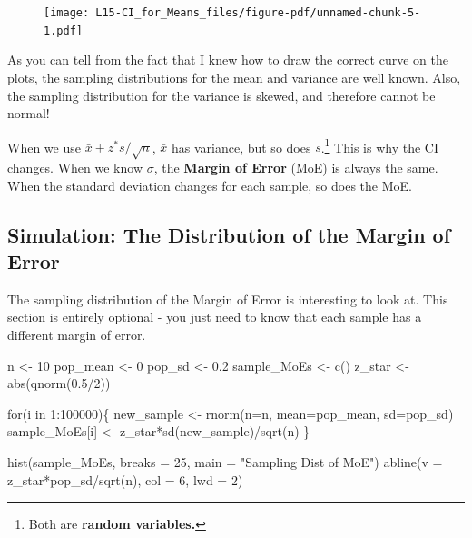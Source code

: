 \documentclass[
  letterpaper,
  DIV=11,
  numbers=noendperiod,
  oneside]{scrreprt}
\newenvironment{Shaded}{\begin{snugshade}}{\end{snugshade}}
\newcommand{\AttributeTok}[1]{\textcolor[rgb]{0.40,0.45,0.13}{#1}}
\newcommand{\ControlFlowTok}[1]{\textcolor[rgb]{0.00,0.23,0.31}{#1}}
\newcommand{\DecValTok}[1]{\textcolor[rgb]{0.68,0.00,0.00}{#1}}
\newcommand{\FloatTok}[1]{\textcolor[rgb]{0.68,0.00,0.00}{#1}}
\newcommand{\FunctionTok}[1]{\textcolor[rgb]{0.28,0.35,0.67}{#1}}
\newcommand{\NormalTok}[1]{\textcolor[rgb]{0.00,0.23,0.31}{#1}}
\newcommand{\OtherTok}[1]{\textcolor[rgb]{0.00,0.23,0.31}{#1}}
\newcommand{\SpecialCharTok}[1]{\textcolor[rgb]{0.37,0.37,0.37}{#1}}
\newcommand{\StringTok}[1]{\textcolor[rgb]{0.13,0.47,0.30}{#1}}
\begin{document}
\begin{figure}[H]

{\centering \texttt{[image: L15-CI\_for\_Means\_files/figure-pdf/unnamed-chunk-5-1.pdf]}

}

\end{figure}

As you can tell from the fact that I knew how to draw the correct curve
on the plots, the sampling distributions for the mean and variance are
well known. Also, the sampling distribution for the variance is skewed,
and therefore cannot be normal!

When we use \(\bar x+ z^*s/\sqrt{n}\), \(\bar x\) has variance, but so
does \(s\).\footnote{Both are \textbf{random variables.}} This is why
the CI changes. When we know \(\sigma\), the \textbf{Margin of Error}
(MoE) is always the same. When the standard deviation changes for each
sample, so does the MoE.

\hypertarget{simulation-the-distribution-of-the-margin-of-error}{%
\subsection{Simulation: The Distribution of the Margin of
Error}\label{simulation-the-distribution-of-the-margin-of-error}}

The sampling distribution of the Margin of Error is interesting to look
at. This section is entirely optional - you just need to know that each
sample has a different margin of error.

\begin{Shaded}
\begin{Highlighting}[]
\NormalTok{n }\OtherTok{\textless{}{-}} \DecValTok{10}
\NormalTok{pop\_mean }\OtherTok{\textless{}{-}} \DecValTok{0}
\NormalTok{pop\_sd }\OtherTok{\textless{}{-}} \FloatTok{0.2}
\NormalTok{sample\_MoEs }\OtherTok{\textless{}{-}} \FunctionTok{c}\NormalTok{()}
\NormalTok{z\_star }\OtherTok{\textless{}{-}} \FunctionTok{abs}\NormalTok{(}\FunctionTok{qnorm}\NormalTok{(}\FloatTok{0.5}\SpecialCharTok{/}\DecValTok{2}\NormalTok{))}

\ControlFlowTok{for}\NormalTok{(i }\ControlFlowTok{in} \DecValTok{1}\SpecialCharTok{:}\DecValTok{100000}\NormalTok{)\{}
\NormalTok{    new\_sample }\OtherTok{\textless{}{-}} \FunctionTok{rnorm}\NormalTok{(}\AttributeTok{n=}\NormalTok{n, }\AttributeTok{mean=}\NormalTok{pop\_mean, }\AttributeTok{sd=}\NormalTok{pop\_sd)}
\NormalTok{    sample\_MoEs[i] }\OtherTok{\textless{}{-}}\NormalTok{ z\_star}\SpecialCharTok{*}\FunctionTok{sd}\NormalTok{(new\_sample)}\SpecialCharTok{/}\FunctionTok{sqrt}\NormalTok{(n)}
\NormalTok{\}}

\FunctionTok{hist}\NormalTok{(sample\_MoEs, }\AttributeTok{breaks =} \DecValTok{25}\NormalTok{,}
    \AttributeTok{main =} \StringTok{"Sampling Dist of MoE"}\NormalTok{)}
\FunctionTok{abline}\NormalTok{(}\AttributeTok{v =}\NormalTok{ z\_star}\SpecialCharTok{*}\NormalTok{pop\_sd}\SpecialCharTok{/}\FunctionTok{sqrt}\NormalTok{(n), }\AttributeTok{col =} \DecValTok{6}\NormalTok{, }\AttributeTok{lwd =} \DecValTok{2}\NormalTok{)}
\end{Highlighting}
\end{Shaded}
\end{document}
